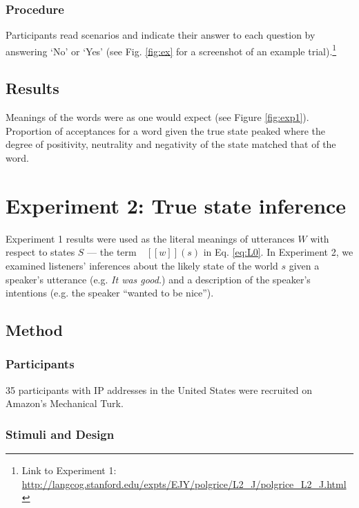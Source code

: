 \documentclass[10pt,letterpaper]{article}
\newcommand{\denote}[1]{\mbox{ $[\![ #1 ]\!]$}}
\newcommand{\ndg}[1]{\textcolor{Green}{[ndg: #1]}}
\begin{document}
\subsubsection{Procedure}

Participants read scenarios and indicate their answer to each question by answering `No' or `Yes' (see Fig. \ref{fig:ex} for a screenshot of an example trial).\footnote{Link to Experiment 1: \url{http://langcog.stanford.edu/expts/EJY/polgrice/L2_J/polgrice_L2_J.html}} 

\subsection{Results}


Meanings of the words were as one would expect (see Figure \ref{fig:exp1}). 
Proportion of acceptances for a word given the true state peaked where the degree of positivity, neutrality and negativity of the state matched that of the word. 

\section{Experiment 2: True state inference}

Experiment 1 results were used as the literal meanings of utterances $W$ with respect to states $S$ --- the term $\denote{w}(s)$ in Eq. \ref{eq:L0}.
In Experiment 2, we examined listeners' inferences about the likely state of the world $s$ given a speaker's utterance (e.g. \emph{It was good.}) and a description of the speaker's intentions (e.g. the speaker ``wanted to be nice'').

\subsection{Method}

\subsubsection{Participants}

35 participants with IP addresses in the United States were recruited on Amazon's Mechanical Turk. 

\subsubsection{Stimuli and Design}
\end{document}
